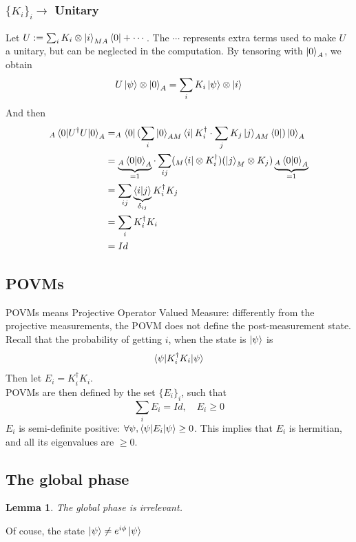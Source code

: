 \documentclass{article}
\newtheorem{lemma}{Lemma}
\begin{document}
\subsubsection*{$\{K_i\}_i \rightarrow$ Unitary}
Let $U := \sum_i K_i \otimes \ket{i}_{MA}\bra{0} + \cdots $.
The $\cdots$ represents extra terms used to make $U$ a unitary, but can be neglected in the
computation.
By tensoring with $\ket{0}_A$, we obtain
\begin{equation}
    U\ket{\psi}\otimes \ket{0}_A = \sum_i K_i \ket{\psi}\otimes\ket{i}
\end{equation}
And then
\begin{equation}
    \begin{aligned}
        _A\braket{0 |U^\dagger U|0}_A
            & = _A\bra{0}(\sum_i\ket{0}_{AM}\bra{i} K_i^\dagger \cdot \sum_j
            K_j\ket{j}_{AM}\bra{0})\ket{0}_A \\
            & = \underbrace{_A\braket{0|0}_A}_{=1} \cdot \sum_{ij}(_M\bra{i}\otimes
            K_i^\dagger)(\ket{j}_M\otimes K_j) \underbrace{_A\braket{0|0}_A}_{=1} \\
            & = \sum_{ij}\underbrace{\braket{i|j}}_{\delta_{ij}} K_i^\dagger K_j \\
            & = \sum_i K_i^\dagger K_i \\
            & = Id
    \end{aligned}
\end{equation}
\subsection{POVMs}
POVMs means Projective Operator Valued Measure: differently from
the projective measurements, the POVM does not define the post-measurement state.\\
Recall that the probability of getting $i$, when the state is $\ket{\psi}$ is
\begin{equation}
\braket{\psi | K_i^\dagger K_i | \psi}
\end{equation}
Then let $E_i = K_i^\dagger K_i$.\\\noindent
POVMs are then defined by the set $\{E_i\}_i$, such that
\begin{equation}
\sum_i E_i = Id, \quad E_i\geq 0
\end{equation}
$E_i$ is semi-definite positive: $ \forall \psi, \braket{\psi|E_i|\psi} \geq 0$.
This implies that $E_i$ is hermitian, and all its eigenvalues are $\geq 0$.

\subsection{The global phase}\label{global-phase}
\begin{lemma}
The global phase is irrelevant.
\end{lemma}
Of couse, the state $\ket{\psi} \neq e^{i\phi}\ket{\psi}$
\end{document}
